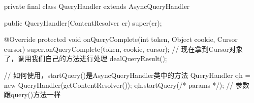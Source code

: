 \begin{javacode}
private final class QueryHandler extends AsyncQueryHandler {
    public QueryHandler(ContentResolver cr) {
        super(cr);
    }

    @Override
    protected void onQueryComplete(int token, Object cookie, Cursor cursor) {
        super.onQueryComplete(token, cookie, cursor);
        // 现在拿到Cursor对象了，调用我们自己的方法进行处理
        dealQueryResult();
    }
}

// 如何使用，startQuery()是AsyncQueryHandler类中的方法
QueryHandler qh = new QueryHandler(getContentResolver());
qh.startQuery(/* params */); // 参数跟query()方法一样
\end{javacode}